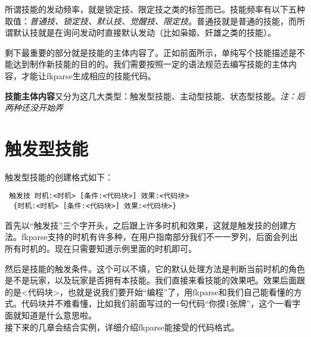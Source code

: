所谓技能的发动频率，就是锁定技、限定技之类的标签而已。技能频率有以下五种取值：\emph{普通技、锁定技、默认技、觉醒技、限定技}。普通技就是普通的技能，而所谓默认技就是在询问发动时直接默认发动（比如枭姬、奸雄之类的技能）。

剩下最重要的部分就是技能的主体内容了。正如前面所示，单纯写个技能描述是不能达到制作新技能的目的的。我们需要按照一定的语法规范去编写技能的主体内容，才能让fkparse生成相应的技能代码。

\textbf{技能主体内容}又分为这几大类型：触发型技能、主动型技能、状态型技能。\textit{注：后两种还没开始弄}

\section{触发型技能}

触发型技能的创建格式如下：

\begin{verbatim}
 触发技 时机:<时机> [条件:<代码块>] 效果:<代码块>
  {时机:<时机> [条件:<代码块>] 效果:<代码块>}
\end{verbatim}

首先以“触发技”三个字开头，之后跟上许多时机和效果，这就是触发技的创建方法。fkparse支持的时机有许多种，在用户指南部分我们不一一罗列，后面会列出所有时机的。现在只需要知道示例里面的时机即可。

然后是技能的触发条件。这个可以不填，它的默认处理方法是判断当前时机的角色是不是玩家，以及玩家是否拥有本技能。我们直接来看技能的效果吧。效果后面跟的是<代码块>，也就是说我们要开始“编程”了，用fkparse和我们自己能看懂的方式。代码块并不难看懂，比如我们前面写过的一句代码“你摸1张牌”，这个一看字面就知道是什么意思啦。\\

接下来的几章会结合实例，详细介绍fkparse能接受的代码格式。
